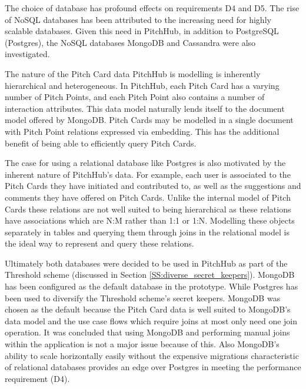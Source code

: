 The choice of database has profound effects on requirements D4 and D5. The rise of NoSQL databases has been attributed to the increasing need for highly scalable databases. Given this need in PitchHub, in addition to PostgreSQL (Postgres), the NoSQL databases MongoDB and Cassandra were also investigated.
\par
The nature of the Pitch Card data PitchHub is modelling is inherently hierarchical and heterogeneous. In PitchHub, each Pitch Card has a varying number of Pitch Points, and each Pitch Point also contains a number of interaction attributes. This data model naturally lends itself to the document model offered by MongoDB. Pitch Cards may be modelled in a single document with Pitch Point relations expressed via embedding. This has the additional benefit of being able to efficiently query Pitch Cards.
\par
The case for using a relational database like Postgres is also motivated by the inherent nature of PitchHub's data. For example, each user is associated to the Pitch Cards they have initiated and contributed to, as well as the suggestions and comments they have offered on Pitch Cards. Unlike the internal model of Pitch Cards these relations are not well suited to being hierarchical as these relations have associations which are N:M rather than 1:1 or 1:N. Modelling these objects separately in tables and querying them through joins in the relational model is the ideal way to represent and query these relations.
\par
Ultimately both databases were decided to be used in PitchHub as part of the Threshold scheme (discussed in Section \ref{SS:diverse_secret_keepers}). MongoDB has been configured as the default database in the prototype. While Postgres has been used to diversify the Threshold scheme's secret keepers. MongoDB was chosen as the default because the Pitch Card data is well suited to MongoDB's data model and the use case flows which require joins at most only need one join operation. It was concluded that using MongoDB and performing manual joins within the application is not a major issue because of this. Also MongoDB's ability to scale horizontally easily without the expensive migrations characteristic of relational databases provides an edge over Postgres in meeting the performance requirement (D4).
